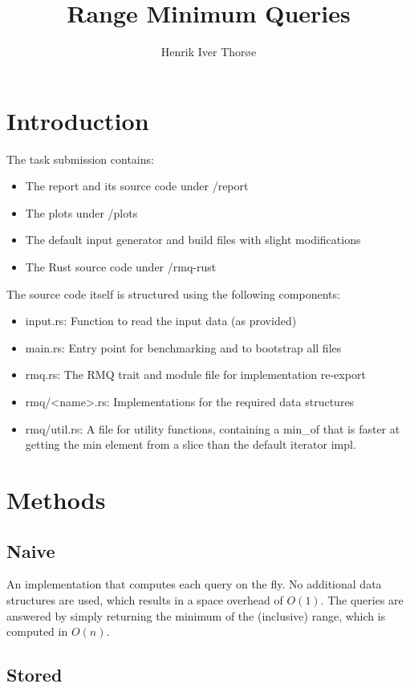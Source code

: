 \documentclass[a4paper,UKenglish,cleveref,thm-restate]{lipics-v2021}
\title{Range Minimum Queries}
\author{Henrik Iver Thorøe}{Karlsruhe Institute of Technology, Germany}{henrik.thoroe@student.kit.edu}{https://orcid.org/0009-0004-9517-1060}{}
\begin{document}
\maketitle


\section{Introduction}
The task submission contains:
\begin{itemize}
	\item The report and its source code under /report
	\item The plots under /plots
	\item The default input generator and build files with slight modifications
	\item The Rust source code under /rmq-rust
\end{itemize}

The source code itself is structured using the following components:
\begin{itemize}
	\item input.rs: Function to read the input data (as provided)
	\item main.rs: Entry point for benchmarking and to bootstrap all files 
	\item rmq.rs: The RMQ trait and module file for implementation re-export 
	\item rmq/<name>.rs: Implementations for the required data structures
	\item rmq/util.rs: A file for utility functions, containing a min\_of that is faster at getting the min element from a slice than the default iterator impl. 
\end{itemize}

\section{Methods}

\subsection{Naive}

An implementation that computes each query on the fly. No additional data structures are used, which results in 
a space overhead of $O(1)$. The queries are answered by simply returning the minimum of the 
(inclusive) range, which is computed in $O(n)$.

\subsection{Stored}
\end{document}
